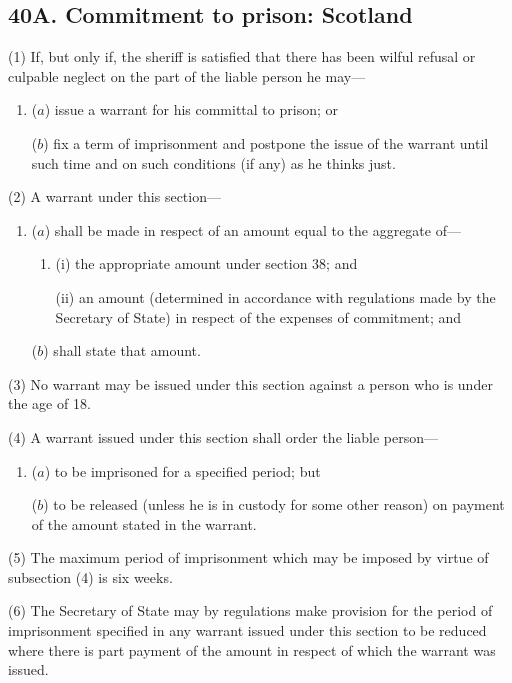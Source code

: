 \documentclass[12pt,a4paper]{article}
\begin{document}
\subsection{40A. Commitment to prison: Scotland}

(1) If, but only if, the sheriff is satisfied that there has been wilful refusal or culpable neglect on the part of the liable person he may---
\begin{enumerate}\item[]
($a$) issue a warrant for his committal to prison; or

($b$) fix a term of imprisonment and postpone the issue of the warrant until such time and on such conditions (if any) as he thinks just.
\end{enumerate}

(2) A warrant under this section---
\begin{enumerate}\item[]
($a$) shall be made in respect of an amount equal to the aggregate of---
\begin{enumerate}\item[]
(i) the appropriate amount under section 38; and

(ii) an amount (determined in accordance with regulations made by the
Secretary of State) in respect of the expenses of commitment; and
\end{enumerate}

($b$) shall state that amount.
\end{enumerate}

(3) No warrant may be issued under this section against a person who is under the
age of 18.

(4) A warrant issued under this section shall order the liable person---
\begin{enumerate}\item[]
($a$) to be imprisoned for a specified period; but

($b$) to be released (unless he is in custody for some other reason) on payment of
the amount stated in the warrant.
\end{enumerate}

(5) The maximum period of imprisonment which may be imposed by virtue of
subsection (4) is six weeks.

(6) The Secretary of State may by regulations make provision for the period of
imprisonment specified in any warrant issued under this section to be reduced where
there is part payment of the amount in respect of which the warrant was issued.
\end{document}
